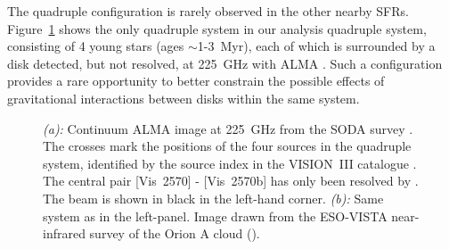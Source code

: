 \documentclass{aa}
\begin{document}
The quadruple configuration is rarely observed in the other nearby SFRs. Figure~\ref{figure:quadruple} shows the only quadruple system in our analysis quadruple system, consisting of 4 young stars (ages $\sim$1-3~Myr), each of which is surrounded by a disk detected, but not resolved, at 225~GHz with ALMA \citep{van_Terwisga_2022}. Such a configuration provides a rare opportunity to better constrain the possible effects of gravitational interactions between disks within the same system.

\begin{figure}
\centering
{}
     \caption{\textit{(a):} Continuum ALMA image at 225~GHz from the SODA survey \citep{van_Terwisga_2022}. The crosses mark the positions of the four sources in the quadruple system, identified by the source index in the VISION~III catalogue \citep{Grossschedl20}. The central pair [Vis~2570] - [Vis~2570b] has only been resolved by \cite{Kounkel16}. The beam is shown in black in the left-hand corner.  \textit{(b):} Same system as in the left-panel. Image drawn from the ESO-VISTA near-infrared survey of the Orion A cloud (\cite{Meingast16}).}
     \label{figure:quadruple}
\end{figure}
\end{document}
